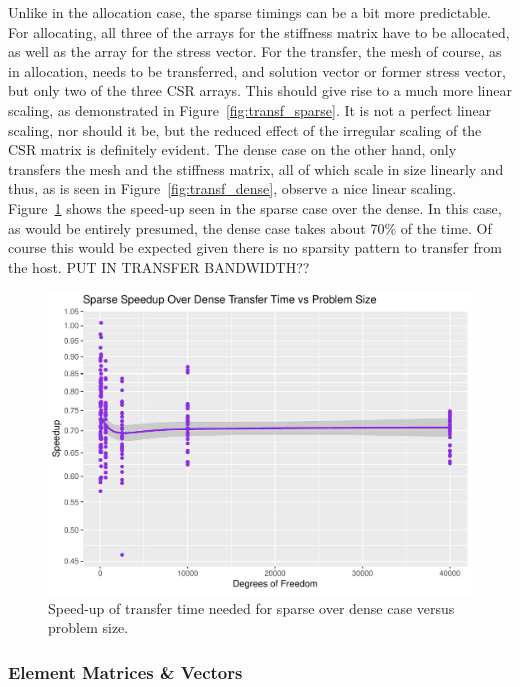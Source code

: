 Unlike in the allocation case, the sparse timings can be a bit more predictable. For allocating, all three of the arrays for the stiffness matrix have to be allocated, as well as the array for the stress vector. For the transfer, the mesh of course, as in allocation, needs to be transferred, and solution vector or former stress vector, but only two of the three CSR arrays. This should give rise to a much more linear scaling, as demonstrated in Figure~\ref{fig:transf_sparse}. It is not a perfect linear scaling, nor should it be, but the reduced effect of the irregular scaling of the CSR matrix is definitely evident. The dense case on the other hand, only transfers the mesh and the stiffness matrix, all of which scale in size linearly and thus, as is seen in Figure~\ref{fig:transf_dense}, observe a nice linear scaling. Figure~\ref{fig:transf_su} shows the speed-up seen in the sparse case over the dense. In this case, as would be entirely presumed, the dense case takes about 70\% of the time. Of course this would be expected given there is no sparsity pattern to transfer from the host. PUT IN TRANSFER BANDWIDTH?? 
\begin{figure}
	\centering
	\includegraphics[width = 0.48\linewidth]{Plots/transf_sparse_dense_speedup_vs_n}
	\caption{Speed-up of transfer time needed for sparse over dense case versus problem size.}
	\label{fig:transf_su}
\end{figure}

\subsubsection{Element Matrices \& Vectors}

